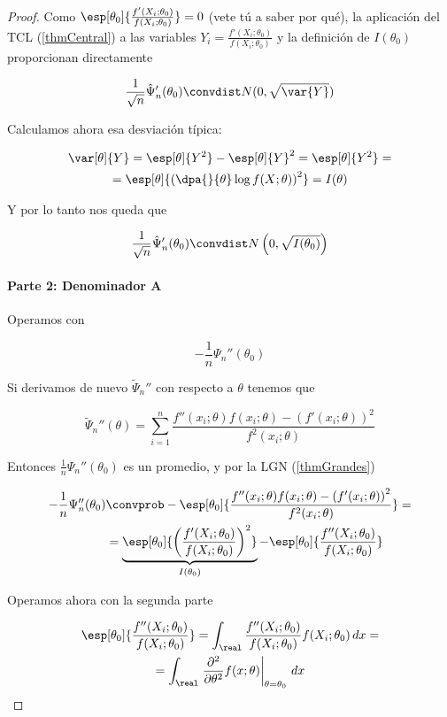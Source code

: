 \documentclass{apuntes}
\begin{document}
\begin{proof}
Como $\esp[\theta_0]{\frac{f'(X_i;\theta_0)}{f(X_i;\theta_0)}} = 0$ (vete tú a saber por qué), la aplicación del TCL (\ref{thmCentral}) a las variables $Y_i = \frac{f'(X_i;\theta_0)}{f(X_i;\theta_0)}$ y la definición de $I(\theta_0)$ proporcionan directamente

\[ \frac{1}{\sqrt{n}}\hat\Psi_n'(\theta_0) \convdist N(0,\sqrt{\var{Y}}) \]

Calculamos ahora esa desviación típica:

\begin{gather*}
 \var[\theta]{Y} = \esp[\theta]{Y^2} - \esp[\theta]{Y}^2 = \esp[\theta]{Y^2} = \\
 = \esp[\theta]{\left(\dpa{}{\theta}\log f(X;\theta)\right)^2} = I(\theta)
\end{gather*}

Y por lo tanto nos queda que

\[ \frac{1}{\sqrt{n}}\hat\Psi_n'(\theta_0) \convdist N\left(0,\sqrt{I(\theta_0)}\right) \]

\paragraph{Parte 2: Denominador A}

Operamos con

\[ -\frac{1}{n}\Psi_n''(\theta_0) \]

Si derivamos de nuevo $\tilde\Psi_n''$ con respecto a $\theta$ tenemos que

\[ \tilde\Psi_n''(\theta) = \sum_{i=1}^n \frac{f''(x_i;\theta)f(x_i;\theta) - \left(f'(x_i;\theta)\right)^2}{f^2(x_i;\theta)} \]

Entonces $\frac{1}{n}\Psi_n''(\theta_0)$ es un promedio, y por la LGN (\ref{thmGrandes})

\begin{align*}
- \frac{1}{n}\Psi_n''(\theta_0) & \convprob - \esp[\theta_0]{\frac{f''(x_i;\theta)f(x_i;\theta) - \left(f'(x_i;\theta)\right)^2}{f^2(x_i;\theta)}} =\\ & =\underbrace{\esp[\theta_0]{\left(\frac{f'(X_i;\theta_0)}{f(X_i;\theta_0)}\right)^2}}_{I(\theta_0)}- \esp[\theta_0]{\frac{f''(X_i;\theta_0)}{f(X_i;\theta_0)}}
\end{align*}

Operamos ahora con la segunda parte

\begin{gather*}
\esp[\theta_0]{\frac{f''(X_i;\theta_0)}{f(X_i;\theta_0)}} = \int_\real \frac{f''(X_i;\theta_0)}{f(X_i;\theta_0)}f(X_i;\theta_0)\,dx = \\
= \int_\real \left.\frac{\partial^2}{\partial\theta^2}f(x;\theta)\right|_{\theta=\theta_0}\,dx
\end{gather*}


\end{proof}
\end{document}
